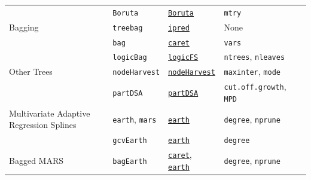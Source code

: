 \documentclass[12pt]{article}
\newcommand{\code}[1]{\mbox{\footnotesize\color{darkblue}\texttt{#1}}}
\begin{document}
\begin{landscape}
\begin{longtable}{lllll}
                  & 
         \code{Boruta} & 
            {\tt \href{http://cran.r-project.org/web/packages/Boruta/index.html}{Boruta}}     & 
            \code{mtry} & \\                 
            
            \rowcolor[rgb]{.95, .95, .95}   
      Bagging&
         \code{treebag} & 
             {\tt \href{http://cran.r-project.org/web/packages/ipred/index.html}{ipred}}       & 
            None & \\                 
\rowcolor[rgb]{.95, .95, .95}               
          &
         \code{bag} & 
             {\tt \href{http://cran.r-project.org/web/packages/caret/index.html}{caret}}       & 
            \code{vars} & \\               
\rowcolor[rgb]{.95, .95, .95}   
          &
         \code{logicBag} & 
             {\tt \href{http://cran.r-project.org/web/packages/logicFS/index.html}{logicFS}}       & 
            \code{ntrees}, \code{nleaves} & \\               
            
            
           Other Trees &
            \code{nodeHarvest} & 
             {\tt \href{http://cran.r-project.org/web/packages/nodeHarvest/index.html}{nodeHarvest}}       & 
            \code{maxinter}, \code{mode}  & \\    
           &
            \code{partDSA} & 
             {\tt \href{http://cran.r-project.org/web/packages/partDSA/index.html}{partDSA}}       & 
            \code{cut.off.growth}, \code{MPD}  & \\     

\rowcolor[rgb]{.95, .95, .95}               
      Multivariate Adaptive Regression Splines &
         \code{earth}, \code{mars} & 
             {\tt \href{http://cran.r-project.org/web/packages/earth/index.html}{earth}}      & 
            \code{degree}, \code{nprune} & \\    
 
\rowcolor[rgb]{.95, .95, .95}             
&
         \code{gcvEarth} & 
             {\tt \href{http://cran.r-project.org/web/packages/earth/index.html}{earth}}      & 
            \code{degree} & \\                  

     Bagged MARS &
         \code{bagEarth} & 
            {\tt \href{http://cran.r-project.org/web/packages/caret/index.html}{caret}},   {\tt \href{http://cran.r-project.org/web/packages/earth/index.html}{earth}}      & 
            \code{degree}, \code{nprune} & \\ 


\end{longtable}
\end{landscape}
\end{document}
